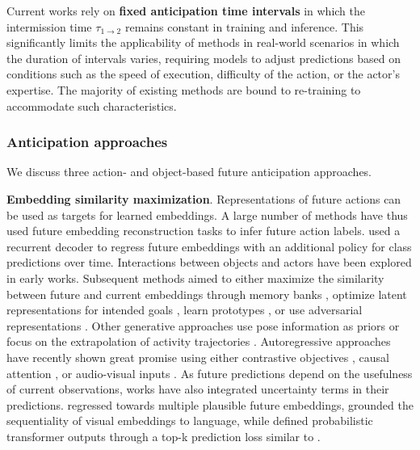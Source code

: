 Current works rely on \textbf{fixed anticipation time intervals} in which the intermission time $\tau_{1 \rightarrow 2}$ remains constant in training and inference. This significantly limits the applicability of methods in real-world scenarios in which the duration of intervals varies, requiring models to adjust predictions based on conditions such as the speed of execution, difficulty of the action, or the actor's expertise. The majority of existing methods are bound to re-training to accommodate such characteristics. 



\subsubsection{Anticipation approaches}
\label{sec:forecasting::anticipation:::methods}


We discuss three action- and object-based future anticipation approaches. 


\noindent
\textbf{Embedding similarity maximization}. Representations of future actions can be used as targets for learned embeddings. A large number of methods have thus used future embedding reconstruction tasks to infer future action labels.  used a recurrent decoder to regress future embeddings with an additional policy for class predictions over time. Interactions between objects and actors  have been explored in early works. Subsequent methods aimed to either maximize the similarity between future and current embeddings through memory banks , optimize latent representations for intended goals , learn prototypes , or use adversarial representations . Other generative approaches use pose information as priors  or focus on the extrapolation of activity trajectories . Autoregressive approaches have recently shown great promise using either contrastive objectives , causal attention , or audio-visual inputs . As future predictions depend on the usefulness of current observations, works have also integrated uncertainty terms in their predictions.  regressed towards multiple plausible future embeddings,  grounded the sequentiality of visual embeddings to language, while  defined probabilistic transformer outputs through a top-k prediction loss similar to .

